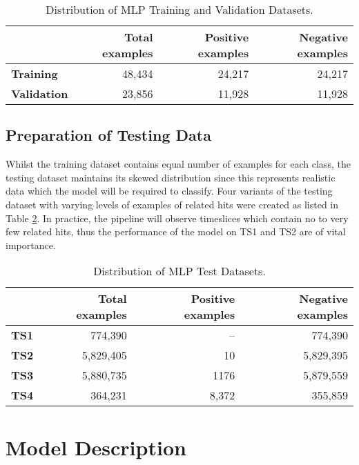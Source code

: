 \begin{table}[htb]
  \centering
  \caption{Distribution of MLP Training and Validation Datasets.}
  \begin{tabular}{lrrr}
    \hline
    & Total examples & Positive examples & Negative examples \\
    \hline
    \textbf{Training} & 48,434 & 24,217 & 24,217 \\
    \textbf{Validation} & 23,856 & 11,928 & 11,928 \\
    \hline
  \end{tabular}
  \label{tab:mlp-train-dist}  
\end{table}

\subsection{Preparation of Testing Data}
\label{sec:mlp-data-prep-test}

Whilst the training dataset contains equal number of examples for each
class, the testing dataset maintains its skewed distribution since
this represents realistic data which the model will be required to
classify. Four variants of the testing dataset with varying levels of
examples of related hits were created as listed in Table
\ref{tab:mlp-test-dist}. In practice, the pipeline will observe
timeslices which contain no to very few related hits, thus the
performance of the model on TS1 and TS2 are of vital importance.

\begin{table}[htb]
  \centering
  \caption{Distribution of MLP Test Datasets.}
  \begin{tabular}{lrrr}
    \hline
    & Total examples & Positive examples & Negative examples \\
    \hline
    \textbf{TS1} & 774,390 & -- & 774,390 \\
    \textbf{TS2} & 5,829,405 & 10 & 5,829,395 \\
    \textbf{TS3} & 5,880,735 & 1176 & 5,879,559 \\
    \textbf{TS4} & 364,231 & 8,372 & 355,859 \\
    \hline
  \end{tabular}
  \label{tab:mlp-test-dist}
\end{table}

\section{Model Description}
\label{sec:mlp-model-desc}

